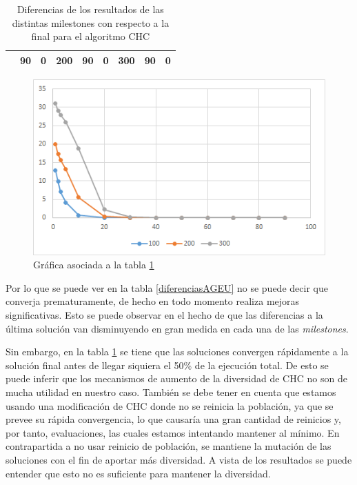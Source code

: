 \begin{table}[]
\begin{tabular}{|cclcclccl|}
\rowcolor[HTML]{DAE8FC} 
\multicolumn{1}{|c|}{\multirow{-13}{*}{\cellcolor[HTML]{FFFFC7}\textbf{100}}} & \multicolumn{1}{c|}{\cellcolor[HTML]{DAE8FC}90}        & \multicolumn{1}{l|}{\cellcolor[HTML]{DAE8FC}0}          & \multicolumn{1}{c|}{\multirow{-13}{*}{\cellcolor[HTML]{FFFFC7}\textbf{200}}} & \multicolumn{1}{c|}{\cellcolor[HTML]{DAE8FC}90}        & \multicolumn{1}{l|}{\cellcolor[HTML]{DAE8FC}0}          & \multicolumn{1}{c|}{\multirow{-13}{*}{\cellcolor[HTML]{FFFFC7}\textbf{300}}} & \multicolumn{1}{c|}{\cellcolor[HTML]{DAE8FC}90}        & 0          \\ \hline
\end{tabular}
\caption{\label{DiferenciasCHC}Diferencias de los resultados de las distintas milestones con respecto a la final para el algoritmo CHC}
\end{table}

\begin{figure}[h]
		\centering
		\includegraphics[scale=1]{imagenes/Experimental/DiferenciasCHC.png}
        \caption{Gráfica asociada a la tabla \ref{DiferenciasCHC}}
        \label{fig:DiferenciasCHC}
\end{figure}

Por lo que se puede ver en la tabla \ref{diferenciasAGEU} no se puede decir que converja prematuramente, de hecho en todo momento realiza mejoras significativas. 
Esto se puede observar en el hecho de que las diferencias a la última solución van disminuyendo en gran medida en cada una de las \textit{milestones}. 

Sin embargo, en la tabla \ref{DiferenciasCHC} se tiene que las soluciones convergen rápidamente a la solución final antes de llegar siquiera el 50\% de la ejecución total. 
De esto se puede inferir que los mecanismos de aumento de la diversidad de CHC no son de mucha utilidad en nuestro caso. 
También se debe tener en cuenta que estamos usando una modificación de CHC donde no se reinicia la población, ya que se prevee su rápida convergencia, lo que causaría una gran cantidad de reinicios y, por tanto, evaluaciones, las cuales estamos intentando mantener al mínimo. 
En contrapartida a no usar reinicio de población, se mantiene la mutación de las soluciones con el fin de aportar más diversidad. 
A vista de los resultados se puede entender que esto no es suficiente para mantener la diversidad. 

